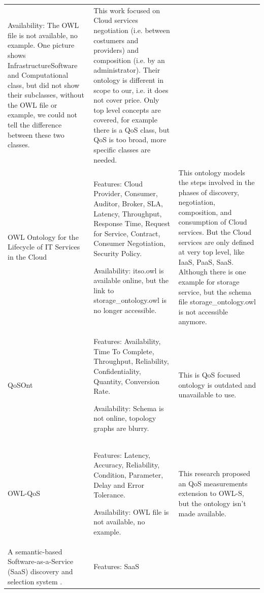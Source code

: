 \begin{longtable}[ht]{ p{.2\linewidth} p{.35\linewidth} p{.35\linewidth} }
        Availability:
            The OWL file is not available, no example. One picture shows InfrastructureSoftware and Computational class, but did not show their subclasses, without the OWL file or example, we could not tell the difference between these two classes. 
        &
        This work focused on Cloud services negotiation (i.e. between costumers and providers) and composition (i.e. by an administrator). Their ontology is different in scope to our, i.e. it does not cover price.
        Only top level concepts are covered, for example there is a QoS class, but QoS is too broad, more specific classes are needed.
        \\
        OWL Ontology for the Lifecycle of IT Services in the Cloud \cite{Joshi2014AutomatingCS}
        &
        Features:
            Cloud Provider, Consumer, Auditor, Broker, SLA, Latency, Throughput, Response Time, Request for Service, Contract, Consumer Negotiation, Security Policy.
        \bigskip
        
        Availability:
            itso.owl is available online, but the link to storage\_ontology.owl is no longer accessible.
        &
        This ontology models the steps involved in the phases of discovery, negotiation, composition, and consumption of Cloud services. But the Cloud services are only defined at very top level, like IaaS, PaaS, SaaS. Although there is one example for storage service, but the schema file storage\_ontology.owl is not accessible anymore.
        \\
    \hline
        QoSOnt \cite{QoSOnt}
        &
        Features:
            Availability, Time To Complete, Throughput, Reliability, Confidentiality, Quantity, Conversion Rate.
        \bigskip
        
        Availability:
            Schema is not online, topology graphs are blurry.
        &
        This is QoS focused                                                      ontology is outdated and unavailable to use.
        \\
        OWL-QoS \cite{OWL-QoS}
        &
        Features:
            Latency, Accuracy, Reliability, Condition, Parameter, Delay and Error Tolerance.
        \bigskip
        
        Availability:
            OWL file is not available, no example.
        &
        This research proposed an QoS measurements extension to OWL-S, but the ontology isn't made available.
        \\
    \hline
    	A semantic-based Software-as-a-Service (SaaS) discovery and selection system \cite{SaaSdiscoverySelectionSystem}.
    	&
    	Features: SaaS
    	\bigskip
    	

\end{longtable}
